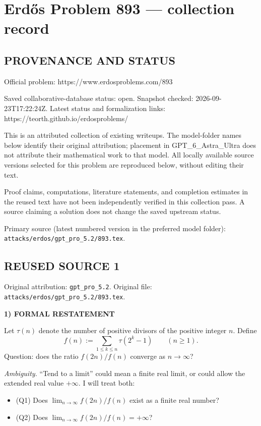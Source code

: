 \section*{Erd\H{o}s Problem 893 --- collection record}

\subsection*{PROVENANCE AND STATUS}
Official problem: https://www.erdosproblems.com/893

Saved collaborative-database status: open.
Snapshot checked: 2026-09-23T17:22:24Z.
Latest status and formalization links: https://teorth.github.io/erdosproblems/

This is an attributed collection of existing writeups. The model-folder names below identify their original attribution; placement in GPT\_6\_Astra\_Ultra does not attribute their mathematical work to that model. All locally available source versions selected for this problem are reproduced below, without editing their text.

Proof claims, computations, literature statements, and completion estimates in the reused text have not been independently verified in this collection pass. A source claiming a solution does not change the saved upstream status.

Primary source (latest numbered version in the preferred model folder): \texttt{attacks/erdos/gpt\_pro\_5.2/893.tex}.

\subsection*{REUSED SOURCE 1}
Original attribution: \texttt{gpt\_pro\_5.2}.
Original file: \texttt{attacks/erdos/gpt\_pro\_5.2/893.tex}.



\noindent\textbf{1) FORMAL RESTATEMENT}

Let $\tau(n)$ denote the number of positive divisors of the positive integer $n$.
Define
\[
 f(n):=\sum_{1\le k\le n}\tau(2^k-1) \qquad (n\ge 1).
\]
Question: does the ratio $f(2n)/f(n)$ converge as $n\to\infty$?

\emph{Ambiguity.} “Tend to a limit” could mean a finite real limit, or could
allow the extended real value $+\infty$. I will treat both:

\begin{itemize}
\item (Q1) Does $\lim_{n\to\infty} f(2n)/f(n)$ exist as a finite real number?
\item (Q2) Does $\lim_{n\to\infty} f(2n)/f(n)=+\infty$?
\end{itemize}

